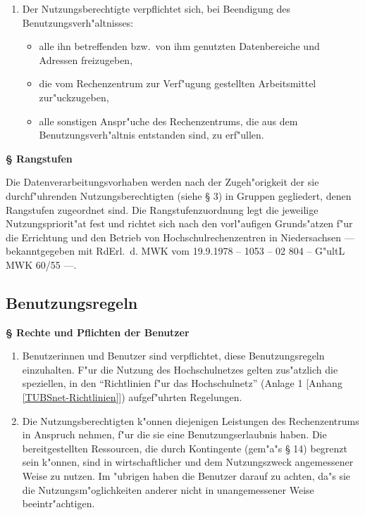 \documentclass[12pt,titlepage,twoside]{scrartcl}
\newcounter{para_nr}
\newcommand{\Paragraph}[1]{{\large\bf\S{}\sf\textbf{\/\stepcounter{para_nr}\arabic{para_nr} #1}}}
\begin{document}
\begin{appendix}
\begin{enumerate}
  \item Der Nutzungsberechtigte verpflichtet sich, bei Beendigung des
    Benutzungsverh"altnisses:
    \begin{itemize}
      \item alle ihn betreffenden bzw.\  von ihm genutzten Datenbereiche und
        Adressen freizugeben,
      \item die vom Rechenzentrum zur Verf"ugung gestellten Arbeitsmittel
        zur"uckzugeben,
      \item alle sonstigen Anspr"uche des Rechenzentrums, die aus dem
        Benutzungsverh"altnis entstanden sind, zu erf"ullen.
    \end{itemize}
\end{enumerate}

\Paragraph{Rangstufen}

Die Datenverarbeitungsvorhaben werden nach der Zugeh"origkeit der
sie durchf"uhrenden Nutzungsberechtigten (siehe \S{} 3) in Gruppen
gegliedert, denen Rangstufen zugeordnet sind. Die Rangstufenzuordnung
legt die jeweilige Nutzungspriorit"at fest und richtet sich nach
den vorl"aufigen Grunds"atzen f"ur die Errichtung und den
Betrieb von Hochschulrechenzentren in Niedersachsen --- bekanntgegeben
mit RdErl.\  d. MWK vom 19.9.1978 -- 1053 -- 02 804 -- G"ultL MWK 60/55 ---.

\subsection{Benutzungsregeln}

\Paragraph{Rechte und Pflichten der Benutzer}

\begin{enumerate}
  \item Benutzerinnen und Benutzer sind verpflichtet, diese Benutzungsregeln
    einzuhalten. F"ur die Nutzung des Hochschulnetzes gelten
    zus"atzlich die speziellen, in den "`Richtlinien f"ur das
    Hochschulnetz"' (Anlage 1 [Anhang \ref{TUBSnet-Richtlinien}])
    aufgef"uhrten Regelungen.

  \item Die Nutzungsberechtigten k"onnen diejenigen Leistungen des
    Rechenzentrums in Anspruch nehmen, f"ur die sie eine
    Benutzungserlaubnis haben. Die bereitgestellten Ressourcen, die durch
    Kontingente (gem"a"s \S{} 14) begrenzt sein k"onnen, sind in
    wirtschaftlicher und dem Nutzungszweck angemessener Weise zu nutzen.
    Im "ubrigen haben die Benutzer darauf zu achten, da"s sie
    die Nutzungsm"oglichkeiten anderer nicht in unangemessener Weise
    beeintr"achtigen.


\end{enumerate}
\end{appendix}
\end{document}
